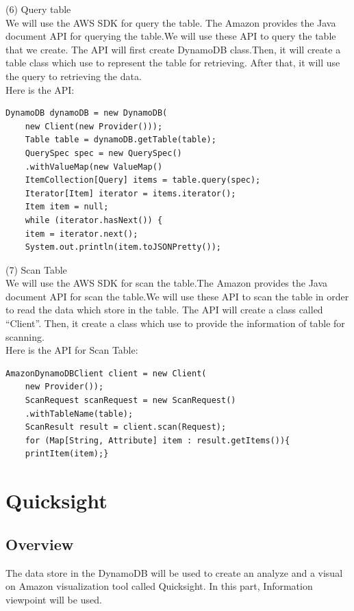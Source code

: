     (6) Query table \\
    We will use the AWS SDK for query the table. The Amazon provides the Java document API for querying the table.We will use these API to query the table that we create. The API will first create DynamoDB class.Then, it will create a table class which use to represent the table for retrieving. After that, it will use the query to retrieving the data.\\
    Here is the API\cite{w2}:
      \begin{lstlisting}[caption=API for query table]
    DynamoDB dynamoDB = new DynamoDB(
    new Client(new Provider()));
    Table table = dynamoDB.getTable(table);
    QuerySpec spec = new QuerySpec()
    .withValueMap(new ValueMap()
    ItemCollection[Query] items = table.query(spec);
    Iterator[Item] iterator = items.iterator();
    Item item = null;
    while (iterator.hasNext()) {
    item = iterator.next();
    System.out.println(item.toJSONPretty());
	\end{lstlisting}
    (7) Scan Table \\
    We will use the AWS SDK for scan the table.The Amazon provides the Java document API for scan the table.We will use these API to scan the table in order to read the data which store in the table. The API will create a class called “Client”. Then, it create a class which use to provide the information of table for scanning.\\
    Here is the API for Scan Table\cite{w3}:
      \begin{lstlisting}[caption=API for scan table]
    AmazonDynamoDBClient client = new Client(
    new Provider());
    ScanRequest scanRequest = new ScanRequest()
    .withTableName(table);
    ScanResult result = client.scan(Request);
    for (Map[String, Attribute] item : result.getItems()){
    printItem(item);}
    \end{lstlisting}

 \section{Quicksight}
    \subsection{Overview}
    The data store in the DynamoDB will be used to create an analyze and a visual on Amazon visualization tool called Quicksight. In this part, Information viewpoint will be used.
